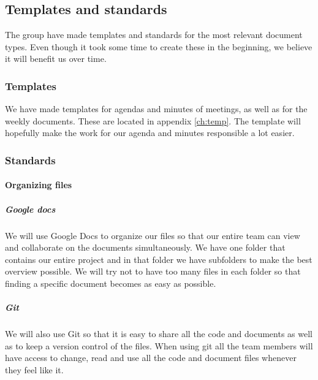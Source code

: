 \subsection{Templates and standards}
The group have made templates and standards for the most relevant document types. Even though it took some time to create these in the beginning, we believe it will benefit us over time.

\subsubsection{Templates}
We have made templates for agendas and minutes of meetings, as well as for the weekly documents. These are located in appendix \ref{ch:temp}. The template will hopefully make the work for our agenda and minutes responsible a lot easier.

\subsubsection{Standards}

\paragraph{Organizing files}
\subparagraph{Google docs}\hfill
\newline
We will use Google Docs to organize our files so that our entire team can view and collaborate on the documents simultaneously. We have one folder that contains our entire project and in that folder we have subfolders to make the best overview possible. We will try not to have too many files in each folder so that finding a specific document becomes as easy as possible.

\subparagraph{Git}\hfill 
\newline
We will also use Git so that it is easy to share all the code and documents as well as to keep a version control of the files. When using \gls{git} all the team members will have access to change, read and use all the code and document files whenever they feel like it.

\newpage

